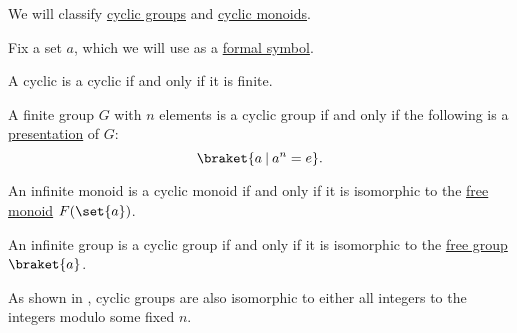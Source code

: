 \begin{proposition}\label{thm:cyclic_monoid_classification}
  We will classify \hyperref[def:cyclic_group]{cyclic groups} and \hyperref[def:cyclic_monoid]{cyclic monoids}.

  Fix a set \( a \), which we will use as a \hyperref[def:formal_language/symbol]{formal symbol}.

  \begin{thmenum}
     A cyclic  is a cyclic  if and only if it is finite.

     A finite group \( G \) with \( n \) elements is a cyclic group if and only if the following is a \hyperref[def:group_presentation]{presentation} of \( G \):
    \begin{equation}\label{eq:thm:cyclic_monoid_classification/finite_group}
      \braket{ a \given a^n = e }.
    \end{equation}

     An infinite monoid is a cyclic monoid if and only if it is isomorphic to the \hyperref[def:free_monoid]{free monoid} \( F(\set{ a }) \).

     An infinite group is a cyclic group if and only if it is isomorphic to the \hyperref[def:free_group]{free group} \( \braket{ a } \).
  \end{thmenum}
\end{proposition}
\begin{comments}
  \item As shown in , cyclic groups are also isomorphic to either all integers to the integers modulo some fixed \( n \).
\end{comments}
